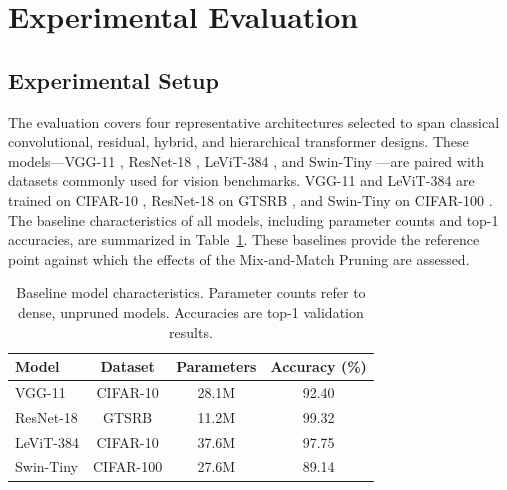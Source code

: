 \documentclass[11pt, conference]{IEEEtran}
\begin{document}

\section{Experimental Evaluation}
\label{sec:results}
\subsection{Experimental Setup}

The evaluation covers four representative architectures selected to span classical convolutional, residual, hybrid, and hierarchical transformer designs. These models—VGG-11 \cite{simonyan2015vgg}, ResNet-18 \cite{he2016resnet}, LeViT-384 \cite{graham2021levit}, and Swin-Tiny \cite{liu2021swin}—are paired with datasets commonly used for vision benchmarks. VGG-11 and LeViT-384 are trained on CIFAR-10 \cite{krizhevsky2009cifar}, ResNet-18 on GTSRB \cite{stallkamp2012gtsrb}, and Swin-Tiny on CIFAR-100 \cite{krizhevsky2009cifar}. The baseline characteristics of all models, including parameter counts and top-1 accuracies, are summarized in Table~\ref{tab:baselines}. These baselines provide the reference point against which the effects of the Mix-and-Match Pruning are assessed.

\begin{table}[t]
\centering
\caption{Baseline model characteristics. Parameter counts refer to dense, unpruned models. Accuracies are top-1 validation results.}
\label{tab:baselines}
\begin{tabular}{lccc}
\toprule
Model & Dataset & Parameters & Accuracy (\%) \\
\midrule
VGG-11 & CIFAR-10 & 28.1M & 92.40 \\
ResNet-18 & GTSRB & 11.2M & 99.32 \\
LeViT-384 & CIFAR-10 & 37.6M & 97.75 \\
Swin-Tiny & CIFAR-100 & 27.6M & 89.14 \\
\bottomrule
\end{tabular}
\end{table}
\end{document}
